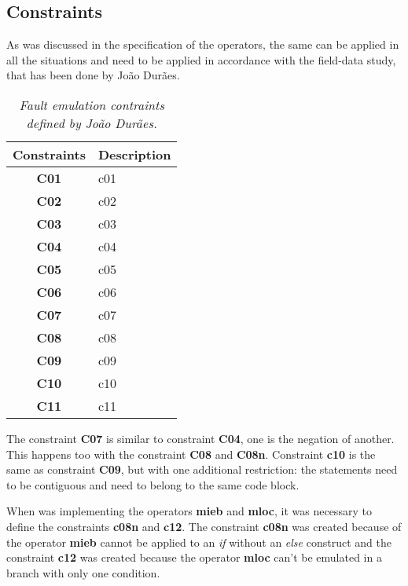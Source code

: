 \subsection{Constraints}

As was discussed in the specification of the operators, the same can be applied in all the situations and need to be applied in accordance with the field-data study, that has been done by João Durães.

\begin{table}[!ht]
\centering
\begin{tabular}{|c|p{12cm}|}
\hline
\textbf{Constraints}            & \multicolumn{1}{c|}{\textbf{Description}}                                     \\ \hline \hline
\textbf{C01}         			& \Acl{c01} \\ \hline
\textbf{C02}         			& \Acl{c02} \\ \hline
\textbf{C03}         			& \Acl{c03} \\ \hline
\textbf{C04}         			& \Acl{c04} \\ \hline
\textbf{C05}         			& \Acl{c05} \\ \hline
\textbf{C06}         			& \Acl{c06} \\ \hline
\textbf{C07}         			& \Acl{c07} \\ \hline
\textbf{C08}         			& \Acl{c08} \\ \hline
\textbf{C09}         			& \Acl{c09} \\ \hline
\textbf{C10}         			& \Acl{c10} \\ \hline
\textbf{C11}         			& \Acl{c11} \\ \hline
\end{tabular}
\caption{\small \sl Fault emulation contraints defined by João Durães.\label{tab:faultEmulationConstraintsDuraes}}
\end{table}

The constraint \textbf{C07} is similar to constraint \textbf{C04}, one is the negation of another. This happens too with the constraint \textbf{C08} and \textbf{C08n}.
Constraint \textbf{c10} is the same as constraint \textbf{C09}, but with one additional restriction: the statements need to be contiguous and need to belong to the same code block.

When was implementing the operators \textbf{\ac{mieb}} and \textbf{\ac{mloc}}, it was necessary to define the constraints \textbf{\ac{c08n}} and \textbf{\ac{c12}}. The constraint \textbf{\ac{c08n}} was created because of the operator \textbf{\ac{mieb}} cannot be applied to an \textit{if} without an \textit{else} construct and the constraint \textbf{\ac{c12}} was created because the operator \textbf{\ac{mloc}} can't be emulated in a branch with only one condition.

